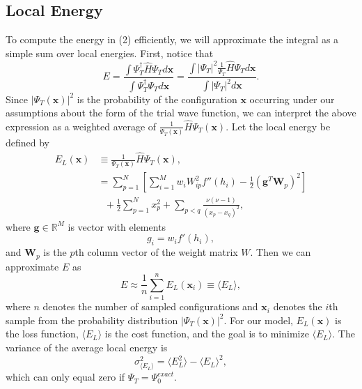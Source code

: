 \documentclass[prb,aps,twocolumn,showpacs,10pt]{revtex4-1}
\begin{document}
\subsection{Local Energy}

To compute the energy in (2) efficiently, we will approximate the integral as a simple sum over local energies. First, notice that
\begin{equation}
E = \frac{\int \Psi^\dag_T \hat{H} \Psi_T d \bm{x} }{\int \Psi_T^\dag \Psi_T d \bm{x} } = \frac{\int |\Psi_T|^2 \frac{1}{\Psi_T} \hat{H} \Psi_T d \bm{x} }{\int |\Psi_T|^2 d \bm{x} }.
\end{equation}
Since $|\Psi_T(\bm{x})|^2$ is the probability of the configuration $\bm{x}$ occurring under our assumptions about the form of the trial wave function, we can interpret the above expression as a weighted average of $\frac{1}{\Psi_T(\bm{x})} \hat{H} \Psi_T(\bm{x})$. Let the local energy be defined by
\begin{align}
E_L(\bm{x}) &\equiv \frac{1}{\Psi_T(\bm{x})} \hat{H} \Psi_T(\bm{x}),\\
&= \sum_{p=1}^N \left[ \sum_{i=1}^M w_i W_{ip}^2 f''(h_i) - \frac{1}{2} \left( \bm{g}^T \bm{W}_p \right)^2 \right]\\
& \ \ \ + \frac{1}{2} \sum_{p=1}^N x_p^2 + \sum_{p<q} \frac{\nu(\nu-1)}{(x_p-x_q)^2},
\end{align}
where $\bm{g}\in \mathbb{R}^M$ is vector with elements 
\begin{equation}
g_i = w_i f'(h_i),
\end{equation}
and $\bm{W}_p$ is the $p$th column vector of the weight matrix $W$. Then we can approximate $E$ as
\begin{equation}
E \approx \frac{1}{n} \sum_{i = 1}^n E_L(\bm{x}_i) \equiv \langle E_L \rangle,
\end{equation}
where $n$ denotes the number of sampled configurations and $\bm{x}_i$ denotes the $i$th sample from the probability distribution $|\Psi_T(\bm{x})|^2$. For our model, $E_L(\bm{x})$ is the loss function, $\langle E_L \rangle$ is the cost function, and the goal is to minimize $\langle E_L \rangle$. The variance of the average local energy is
\begin{equation}
\sigma_{\langle E_L \rangle}^2 = \langle E_L^2 \rangle - \langle E_L \rangle^2,
\end{equation}
which can only equal zero if $\Psi_T = \Psi_0^{exact}$.
\end{document}
